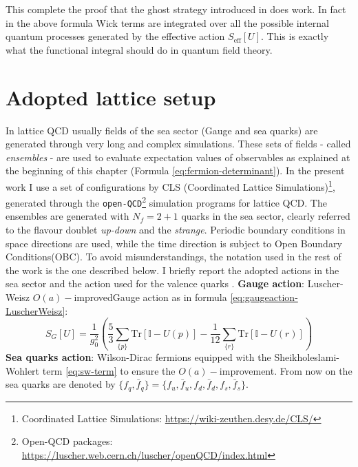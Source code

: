\documentclass[english, LaM, oneside, noexaminfo]{sapthesis}
\newcommand{\oaid}{$O(a)-$improved}
\newcommand{\oait}{$O(a)-$improvement}
\newcommand{\obc}{Open Boundary Conditions}
\newcommand{\tr}{\text{Tr}}
\begin{document}
This complete the proof that the ghost strategy introduced in \cite{Morel} does work.
In fact in the above formula Wick terms are integrated over all the possible internal quantum processes generated by the effective action $S_\text{eff}[U]$.
This is exactly what the functional integral should do in quantum field theory.

\section{Adopted lattice setup}\label{sec:setup}
\noindent
In lattice QCD usually fields of the sea sector (Gauge and sea quarks) are generated through very long and complex simulations.
These sets of fields - called {\it ensembles} - are used to evaluate expectation values of observables as explained at the beginning of this chapter (Formula \ref{eq:fermion-determinant}).
In the present work I use a set of configurations by CLS \cite{Bruno} (Coordinated Lattice Simulations)\footnote{Coordinated Lattice Simulations:  \href{https://wiki-zeuthen.desy.de/CLS/}{https://wiki-zeuthen.desy.de/CLS/}}, generated through the \texttt{open-QCD}\footnote{Open-QCD packages: \href{https://luscher.web.cern.ch/luscher/openQCD/index.html}{https://luscher.web.cern.ch/luscher/openQCD/index.html}} simulation programs for lattice QCD.
The ensembles are generated with $N_f = 2+1$ quarks in the sea sector, clearly referred to the flavour doublet {\it up-down} and the {\it strange}.
Periodic boundary conditions in space directions are used, while the time direction is subject to \obc\space (OBC).
To avoid misunderstandings, the notation used in the rest of the work is the one described below.
I briefly report the adopted actions in the sea sector and the action used for the valence quarks \cite{tmMixAct}.
\newline\newline
{\bf Gauge action}: Luscher-Weisz \oaid\space Gauge action as in formula \ref{eq:gaugeaction-LuscherWeisz}:
\begin{equation*}
    S_G[U] = \frac{1}{g_0^2} \left( \frac{5}{3} \sum_{\{p\}} \tr \left[ \mathbb{I} - U(p)\right] - \frac{1}{12} \sum_{\{r\}} \tr \left[ \mathbb{I} - U(r)\right] \right) 
\end{equation*}
\newline
{\bf Sea quarks action}: Wilson-Dirac fermions equipped with the Sheikholeslami-Wohlert term \ref{eq:sw-term} to ensure the \oait.
From now on the sea quarks are denoted by $\{f_q, \bar f_q\} = \{f_u, \bar f_u, f_d, \bar f_d, f_s, \bar f_s\}$.
\end{document}
